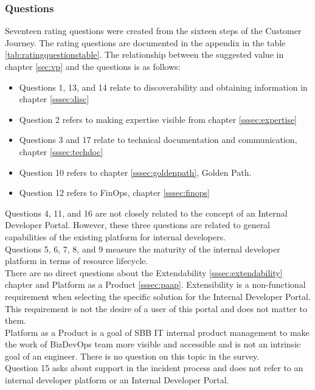 \documentclass[a4paper,12pt]{article}
\begin{document}
    \subsubsection{Questions}
    \label{sssec:questions}
    Seventeen rating questions were created from the sixteen steps of the Customer Journey.
    The rating questions are documented in the appendix in the table \ref{tab:ratingquestionstable}.
    The relationship between the suggested value in chapter \ref{sec:vp} and the questions is as follows:
    \begin{itemize}
        \item Questions 1, 13, and 14 relate to discoverability and obtaining information in chapter \ref{sssec:disc}
        \item Question 2 refers to making expertise visible from chapter \ref{sssec:expertise}
        \item Questions 3 and 17 relate to technical documentation and communication, chapter \ref{sssec:techdoc}
        \item Question 10 refers to chapter \ref{sssec:goldenpath}, Golden Path.
        \item Question 12 refers to FinOps, chapter \ref{sssec:finops}
    \end{itemize}
    Questions 4, 11, and 16 are not closely related to the concept of an Internal Developer Portal.
    However, these three questions are related to general capabilities of the existing platform for internal developers.\\
    Questions 5, 6, 7, 8, and 9 measure the maturity of the internal developer platform in terms of resource lifecycle.\\
    There are no direct questions about the Extendability \ref{sssec:extendability} chapter and Platform as a Product
    \ref{sssec:paap}.
    Extensibility is a non-functional requirement when selecting the specific solution for the Internal Developer Portal.
    This requirement is not the desire of a user of this portal and does not matter to them.\\
    Platform as a Product is a goal of SBB IT internal product management to make the work of BizDevOps
    team more visible and accessible and is not an intrinsic goal of an engineer.
    There is no question on this topic in the survey.\\
    Question 15 asks about support in the incident process and does not refer to an internal developer platform or an
    Internal Developer Portal. \\
\end{document}
